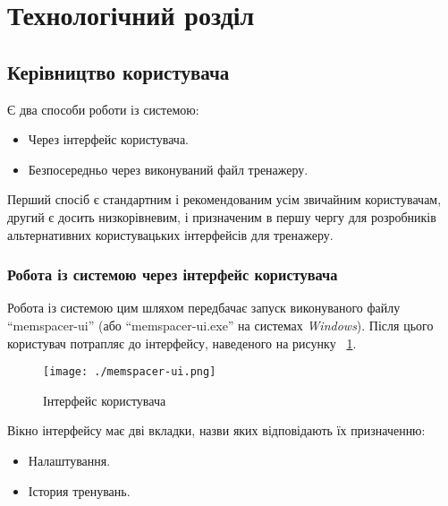 \section{Технологічний розділ}
\subsection{Керівництво користувача}
Є два способи роботи із системою:
\begin{itemize}
  \item Через інтерфейс користувача.
  \item Безпосередньо через виконуваний файл тренажеру.
\end{itemize}

Перший спосіб є стандартним і рекомендованим усім звичайним користувачам, другий є досить низкорівневим, і призначеним в першу чергу для розробників альтернативних користувацьких інтерфейсів для тренажеру.
\subsubsection{Робота із системою через інтерфейс користувача}
Робота із системою цим шляхом передбачає запуск виконуваного файлу ``memspacer-ui'' (або ``memspacer-ui.exe'' на системах \emph{Windows}). Після цього користувач потрапляє до інтерфейсу, наведеного на рисунку ~\ref{fig:memspacer-ui}.
\begin{figure}[here]
  \caption{Інтерфейс користувача}
  \centering\texttt{[image: ./memspacer-ui.png]}
  \label{fig:memspacer-ui}
\end{figure}

Вікно інтерфейсу має дві вкладки, назви яких відповідають їх призначенню:
\begin{itemize}
  \item Налаштування.
  \item Істория тренувань.
\end{itemize}

